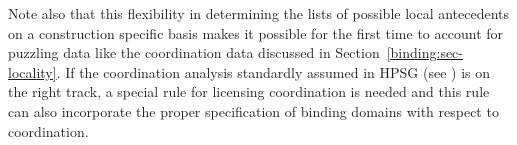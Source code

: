\documentclass[output=paper
	        ,collection
	        ,collectionchapter
 	        ,biblatex
                ,babelshorthands
                ,newtxmath
                ,draftmode
                ,colorlinks, citecolor=brown
]{langscibook}
\begin{document}
Note also that this flexibility in determining the lists of possible local antecedents on a
construction specific basis makes it possible for the first time to account for puzzling data like
the coordination data discussed in Section~\ref{binding:sec-locality}. If the coordination analysis
standardly assumed in HPSG (see ) is on the right track, a special
rule for licensing coordination is needed and this rule can also incorporate the proper
specification of binding domains with respect to coordination.






\end{document}
